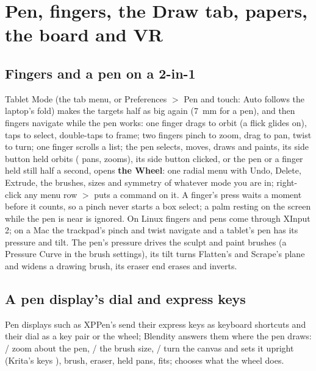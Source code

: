 \chapter{Pen, fingers, the Draw tab, papers, the board and VR}
\label{ch:pen}

\section{Fingers and a pen on a 2-in-1}
Tablet Mode (the tab menu, or Preferences $>$ Pen and touch: Auto follows the laptop's fold) makes the targets half as
big again (7~mm for a pen), and then fingers navigate while the pen works: one finger drags to orbit (a flick glides
on), taps to select, double-taps to frame; two fingers pinch to zoom, drag to pan, twist to turn; one finger scrolls a
list; the pen selects, moves, draws and paints, its side button held orbits ( pans,  zooms), its
side button clicked, or the pen or a finger held still half a second, opens \textbf{the Wheel}: one radial menu with
Undo, Delete, Extrude, the brushes, sizes and symmetry of whatever mode you are in; right-click any menu row $>$  puts a command on it. A finger's press waits a moment before it counts, so a pinch never starts a box
select; a palm resting on the screen while the pen is near is ignored. On Linux fingers and pens come through XInput 2;
on a Mac the trackpad's pinch and twist navigate and a tablet's pen has its pressure and tilt. The pen's pressure drives
the sculpt and paint brushes (a Pressure Curve in the brush settings), its tilt turns Flatten's and Scrape's plane and
widens a drawing brush, its eraser end erases and inverts.

\section{A pen display's dial and express keys}
Pen displays such as XPPen's send their express keys as keyboard shortcuts and their dial as a key pair or the wheel;
Blendity answers them where the pen draws:  /  zoom about the pen, \key{[} / \key{]} the brush
size,  /  turn the canvas and  sets it upright (Krita's keys \cite{Krita2026}),  brush,
 eraser,  held pans,  fits;  chooses what the wheel does.

